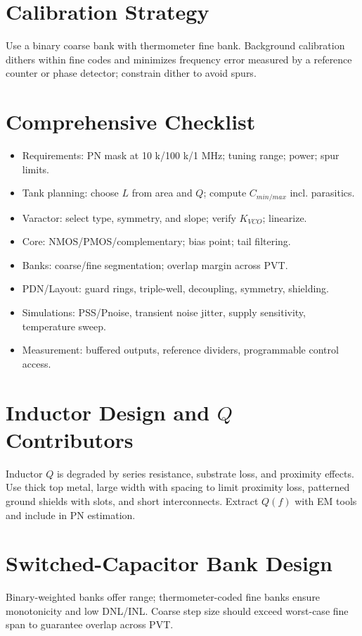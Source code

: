 \section{Calibration Strategy}
Use a binary coarse bank with thermometer fine bank. Background calibration dithers within fine codes and minimizes frequency error measured by a reference counter or phase detector; constrain dither to avoid spurs.

\section{Comprehensive Checklist}
\begin{itemize}
  \item Requirements: PN mask at 10 k/100 k/1 MHz; tuning range; power; spur limits.
  \item Tank planning: choose $L$ from area and $Q$; compute $C_{min/max}$ incl. parasitics.
  \item Varactor: select type, symmetry, and slope; verify $K_{VCO}$; linearize.
  \item Core: NMOS/PMOS/complementary; bias point; tail filtering.
  \item Banks: coarse/fine segmentation; overlap margin across PVT.
  \item PDN/Layout: guard rings, triple-well, decoupling, symmetry, shielding.
  \item Simulations: PSS/Pnoise, transient noise jitter, supply sensitivity, temperature sweep.
  \item Measurement: buffered outputs, reference dividers, programmable control access.
\end{itemize}

\section{Inductor Design and $Q$ Contributors}
Inductor $Q$ is degraded by series resistance, substrate loss, and proximity effects. Use thick top metal, large width with spacing to limit proximity loss, patterned ground shields with slots, and short interconnects. Extract $Q(f)$ with EM tools and include in PN estimation.

\section{Switched-Capacitor Bank Design}
Binary-weighted banks offer range; thermometer-coded fine banks ensure monotonicity and low DNL/INL. Coarse step size should exceed worst-case fine span to guarantee overlap across PVT.

